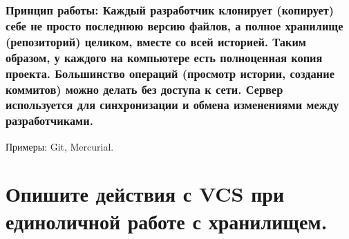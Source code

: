 \documentclass[
  english,
  russian,
  12pt,
  a4paper,
  DIV=11,
  numbers=noendperiod]{scrreprt}
\begin{document}
\subsubsection{Принцип работы: Каждый разработчик клонирует (копирует)
себе не просто последнюю версию файлов, а полное хранилище (репозиторий)
целиком, вместе со всей историей. Таким образом, у каждого на компьютере
есть полноценная копия проекта. Большинство операций (просмотр истории,
создание коммитов) можно делать без доступа к сети. Сервер используется
для синхронизации и обмена изменениями между
разработчиками.}\label{ux43fux440ux438ux43dux446ux438ux43f-ux440ux430ux431ux43eux442ux44b-ux43aux430ux436ux434ux44bux439-ux440ux430ux437ux440ux430ux431ux43eux442ux447ux438ux43a-ux43aux43bux43eux43dux438ux440ux443ux435ux442-ux43aux43eux43fux438ux440ux443ux435ux442-ux441ux435ux431ux435-ux43dux435-ux43fux440ux43eux441ux442ux43e-ux43fux43eux441ux43bux435ux434ux43dux44eux44e-ux432ux435ux440ux441ux438ux44e-ux444ux430ux439ux43bux43eux432-ux430-ux43fux43eux43bux43dux43eux435-ux445ux440ux430ux43dux438ux43bux438ux449ux435-ux440ux435ux43fux43eux437ux438ux442ux43eux440ux438ux439-ux446ux435ux43bux438ux43aux43eux43c-ux432ux43cux435ux441ux442ux435-ux441ux43e-ux432ux441ux435ux439-ux438ux441ux442ux43eux440ux438ux435ux439.-ux442ux430ux43aux438ux43c-ux43eux431ux440ux430ux437ux43eux43c-ux443-ux43aux430ux436ux434ux43eux433ux43e-ux43dux430-ux43aux43eux43cux43fux44cux44eux442ux435ux440ux435-ux435ux441ux442ux44c-ux43fux43eux43bux43dux43eux446ux435ux43dux43dux430ux44f-ux43aux43eux43fux438ux44f-ux43fux440ux43eux435ux43aux442ux430.-ux431ux43eux43bux44cux448ux438ux43dux441ux442ux432ux43e-ux43eux43fux435ux440ux430ux446ux438ux439-ux43fux440ux43eux441ux43cux43eux442ux440-ux438ux441ux442ux43eux440ux438ux438-ux441ux43eux437ux434ux430ux43dux438ux435-ux43aux43eux43cux43cux438ux442ux43eux432-ux43cux43eux436ux43dux43e-ux434ux435ux43bux430ux442ux44c-ux431ux435ux437-ux434ux43eux441ux442ux443ux43fux430-ux43a-ux441ux435ux442ux438.-ux441ux435ux440ux432ux435ux440-ux438ux441ux43fux43eux43bux44cux437ux443ux435ux442ux441ux44f-ux434ux43bux44f-ux441ux438ux43dux445ux440ux43eux43dux438ux437ux430ux446ux438ux438-ux438-ux43eux431ux43cux435ux43dux430-ux438ux437ux43cux435ux43dux435ux43dux438ux44fux43cux438-ux43cux435ux436ux434ux443-ux440ux430ux437ux440ux430ux431ux43eux442ux447ux438ux43aux430ux43cux438.}

Примеры: Git, Mercurial.

\section{Опишите действия с VCS при единоличной работе с
хранилищем.}\label{ux43eux43fux438ux448ux438ux442ux435-ux434ux435ux439ux441ux442ux432ux438ux44f-ux441-vcs-ux43fux440ux438-ux435ux434ux438ux43dux43eux43bux438ux447ux43dux43eux439-ux440ux430ux431ux43eux442ux435-ux441-ux445ux440ux430ux43dux438ux43bux438ux449ux435ux43c.}
\end{document}
